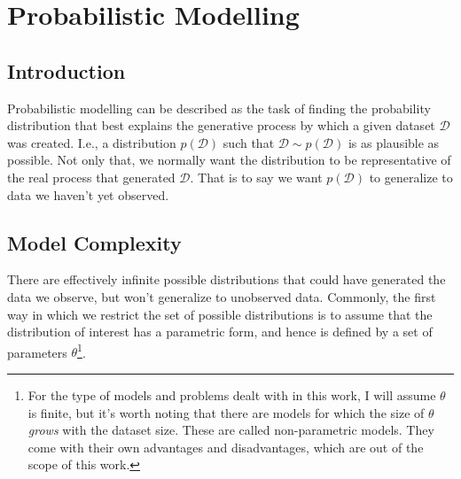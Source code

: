 \chapter{Probabilistic Modelling}
\label{chapter:probmodel}

\section{Introduction}
\label{section:probmodelintro}
Probabilistic modelling can be described as the task of finding the probability
distribution that best explains the generative process by which a given dataset
$\mathcal{D}$ was created. I.e., a distribution $p(\mathcal{D})$ such that
$\mathcal{D} \sim p(\mathcal{D})$ is as plausible as possible. Not only that,
we normally want the distribution to be representative of the real process that
generated $\mathcal{D}$. That is to say we want $p(\mathcal{D})$ to generalize
to data we haven't yet observed.

\section{Model Complexity}
\label{section:modelcomplexity}
There are effectively infinite possible distributions that could have generated
the data we observe, but won't generalize to unobserved data. Commonly, the first
way in which we restrict the set of possible distributions is to assume that the
distribution of interest has a parametric form, and hence is defined by a set of
parameters $\theta$\footnote{For the type of models and problems dealt with in
this work, I will assume $\theta$ is finite, but it's worth noting that there are
models for which the size of $\theta$ \emph{grows} with the dataset size. These
are called non-parametric models. They come with their own advantages and
disadvantages, which are out of the scope of this work.}.

